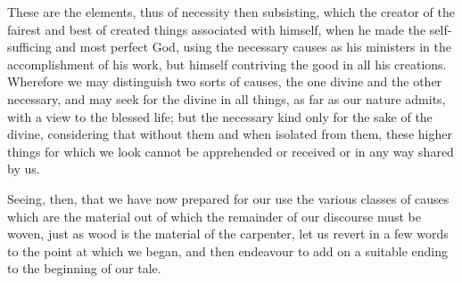 \documentclass[11pt,letter]{article}
\begin{document}
\par  These are the elements, thus of necessity then subsisting, which the creator of the fairest and best of created things associated with himself, when he made the self-sufficing and most perfect God, using the necessary causes as his ministers in the accomplishment of his work, but himself contriving the good in all his creations. Wherefore we may distinguish two sorts of causes, the one divine and the other necessary, and may seek for the divine in all things, as far as our nature admits, with a view to the blessed life; but the necessary kind only for the sake of the divine, considering that without them and when isolated from them, these higher things for which we look cannot be apprehended or received or in any way shared by us.

\par  Seeing, then, that we have now prepared for our use the various classes of causes which are the material out of which the remainder of our discourse must be woven, just as wood is the material of the carpenter, let us revert in a few words to the point at which we began, and then endeavour to add on a suitable ending to the beginning of our tale.
\end{document}
